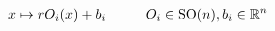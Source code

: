 \documentclass[preview]{standalone}
\begin{document}
\begin{align*}
x \mapsto r O_i(x) + b_i\hspace{1 cm} O_i \in \text{SO}(n), b_i \in \mathbb{R}^n \\
\end{align*}
\end{document}
